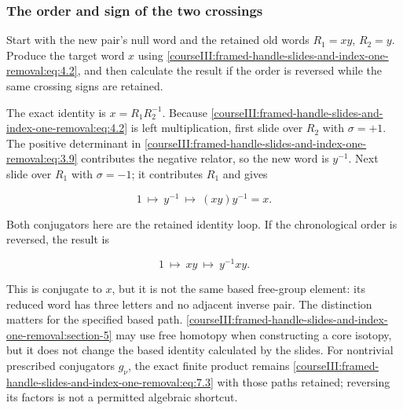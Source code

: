 \label{courseIII:framed-handle-slides-and-index-one-removal:section-9}

\subsubsection{The order and sign of the two crossings}
\label{courseIII:framed-handle-slides-and-index-one-removal:section-9.1}

\label{courseIII:low-index-slides:9.1}

Start with the new pair's null word and the retained old words
\(R_1=xy\), \(R_2=y\). Produce the target word \(x\) using \eqref{courseIII:framed-handle-slides-and-index-one-removal:eq:4.2}, and then calculate the result if the order is reversed while the same crossing signs are retained.

The exact identity is \(x=R_1R_2^{-1}\). Because \eqref{courseIII:framed-handle-slides-and-index-one-removal:eq:4.2} is left multiplication, first slide over \(R_2\) with \(\sigma=+1\). The positive determinant in \eqref{courseIII:framed-handle-slides-and-index-one-removal:eq:3.9} contributes the negative relator, so the new word is \(y^{-1}\). Next slide over \(R_1\) with \(\sigma=-1\); it contributes \(R_1\) and gives

\begin{equation}
1\ \longmapsto\ y^{-1}\
       \longmapsto\ (xy)y^{-1}=x.
 \label{courseIII:framed-handle-slides-and-index-one-removal:eq:9.1}
\end{equation}

Both conjugators here are the retained identity loop. If the chronological order is reversed, the result is

\begin{equation}
1\ \longmapsto\ xy\
       \longmapsto\ y^{-1}xy .
 \label{courseIII:framed-handle-slides-and-index-one-removal:eq:9.2}
\end{equation}

This is conjugate to \(x\), but it is not the same based free-group element: its reduced word has three letters and no adjacent inverse pair. The distinction matters for the specified based path. \cref{courseIII:framed-handle-slides-and-index-one-removal:section-5} may use free homotopy when constructing a core isotopy, but it does not change the based identity calculated by the slides. For nontrivial prescribed conjugators \(g_\nu\), the exact finite product remains \eqref{courseIII:framed-handle-slides-and-index-one-removal:eq:7.3} with those paths retained; reversing its factors is not a permitted algebraic shortcut.

